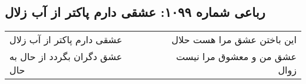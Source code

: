 \begin{center}
\section*{رباعی شماره ۱۰۹۹: عشقی دارم پاکتر از آب زلال}
\label{sec:1099}
\begin{longtable}{l p{0.5cm} r}
عشقی دارم پاکتر از آب زلال
&&
این باختن عشق مرا هست حلال
\\
عشق دگران بگردد از حال به حال
&&
عشق من و معشوق مرا نیست زوال
\\
\end{longtable}
\end{center}
